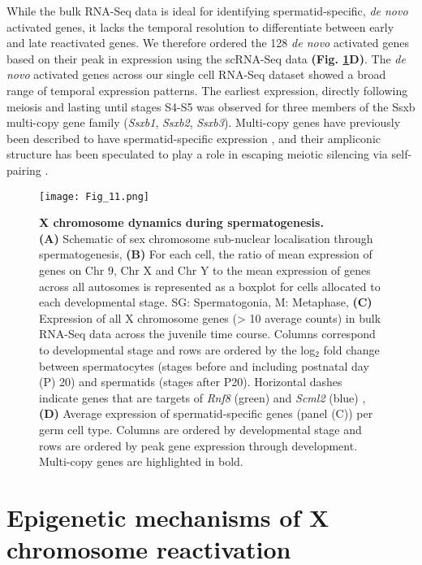 While the bulk RNA-Seq data is ideal for identifying spermatid-specific, \emph{de novo} activated genes, it lacks the temporal resolution to differentiate between early and late reactivated genes. 
We therefore ordered the 128 \emph{de novo} activated genes based on their peak in expression using the scRNA-Seq data \textbf{(Fig. \ref{fig3:X_reactivation}D)}. 
The \emph{de novo} activated genes across our single cell RNA-Seq dataset showed a broad range of temporal expression patterns. 
The earliest expression, directly following meiosis and lasting until stages S4-S5 was observed for three members of the \gls{Ssxb} multi-copy gene family (\textit{Ssxb1}, \textit{Ssxb2}, \textit{Ssxb3}). 
Multi-copy genes have previously been described to have spermatid-specific expression \citep{Mueller2008}, and their ampliconic structure has been speculated to play a role in escaping meiotic silencing via self-pairing \citep{Disteche2008}.

\newpage

\begin{figure}[!h]
\centering
\texttt{[image: Fig\_11.png]}
\caption[X chromosome dynamics during spermatogenesis]{\textbf{X chromosome dynamics during spermatogenesis.} \\
\textbf{(A)} Schematic of sex chromosome sub-nuclear localisation through spermatogenesis, 
\textbf{(B)} For each cell, the ratio of mean expression of genes on Chr 9, Chr X and Chr Y to the mean expression of genes across all autosomes is represented as a boxplot for cells allocated to each developmental stage. SG: Spermatogonia, M: Metaphase, 
\textbf{(C)} Expression of all X chromosome genes (> 10 average counts) in bulk RNA-Seq data across the juvenile time course. 
Columns correspond to developmental stage and rows are ordered by the log$_2$ fold change between spermatocytes (stages before and including postnatal day (P) 20) and spermatids (stages after P20). 
Horizontal dashes indicate genes that are targets of \textit{Rnf8} (green) and \textit{Scml2} (blue) \citep{Adams2018}, 
\textbf{(D)} Average expression of spermatid-specific genes (panel (C)) per germ cell type. 
Columns are ordered by developmental stage and rows are ordered by peak gene expression through development. Multi-copy genes are highlighted in bold.}
\label{fig3:X_reactivation}
\end{figure}

\newpage

\section{Epigenetic mechanisms of X chromosome reactivation}

